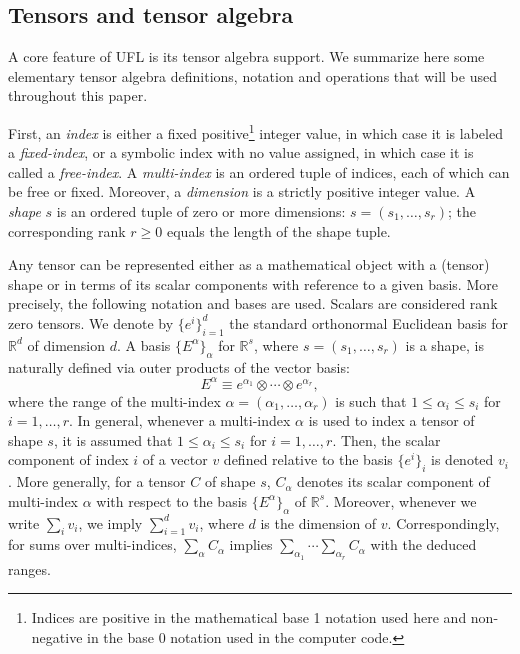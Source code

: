 \documentclass[prodmode,acmtoms]{acmsmall}
\newcommand{\R}{\mathbb{R}}
\begin{document}
\subsection{Tensors and tensor algebra}

A core feature of UFL is its tensor algebra support. We summarize here
some elementary tensor algebra definitions, notation and operations that
will be used throughout this paper.

First, an \emph{index} is either a fixed positive\footnote{Indices are
  positive in the mathematical base 1 notation used here and
  non-negative in the base 0 notation used in the computer code.}
integer value, in which case it is labeled a \emph{fixed-index}, or a
symbolic index with no value assigned, in which case it is called a
\emph{free-index}. A \emph{multi-index} is an ordered tuple of
indices, each of which can be free or fixed. Moreover, a
\emph{dimension} is a strictly positive integer value. A \emph{shape} $s$ is an
ordered tuple of zero or more dimensions: $s = (s_1, \dots, s_r)$; the
corresponding rank $r \geqslant 0$ equals the length of the shape
tuple.

Any tensor can be represented either as a mathematical object with a
(tensor) shape or in terms of its scalar
components with reference to a given basis. More precisely, the
following notation and bases are used. Scalars are considered rank
zero tensors. We denote by $\{ e^i \}_{i=1}^{d}$ the standard
orthonormal Euclidean basis for $\R^d$ of dimension $d$. A basis
$\{E^{\alpha}\}_{\alpha}$ for $\R^{s}$, where $s = (s_1, \dots, s_r)$
is a shape, is naturally defined via outer products of the vector
basis:
\begin{equation}
  E^{\alpha} \equiv e^{\alpha_1} \otimes \cdots \otimes e^{\alpha_r},
\end{equation}
where the range of the multi-index $\alpha = (\alpha_1, \dots,
\alpha_r)$ is such that $1 \leqslant \alpha_i \leqslant s_i$ for $i =
1, \dots, r$. In general, whenever a multi-index $\alpha$ is used to
index a tensor of shape $s$, it is assumed that $1 \leqslant
\alpha_i \leqslant s_i$ for $i = 1, \dots, r$. Then, the scalar
component of index $i$ of a vector $v$ defined relative to the basis
$\{e^i\}_i$ is denoted $v_i$. More generally, for a tensor $C$ of
shape $s$, $C_{\alpha}$ denotes its scalar component of multi-index
$\alpha$ with respect to the basis $\{ E^{\alpha} \}_{\alpha}$ of
$\R^s$. Moreover, whenever we write $\sum_i v_i$, we imply
$\sum_{i=1}^{d} v_i$, where $d$ is the dimension of
$v$. Correspondingly, for sums over multi-indices, $\sum_\alpha
C_\alpha$ implies $\sum_{\alpha_1}\cdots\sum_{\alpha_r} C_\alpha$ with
the deduced ranges.
\end{document}
